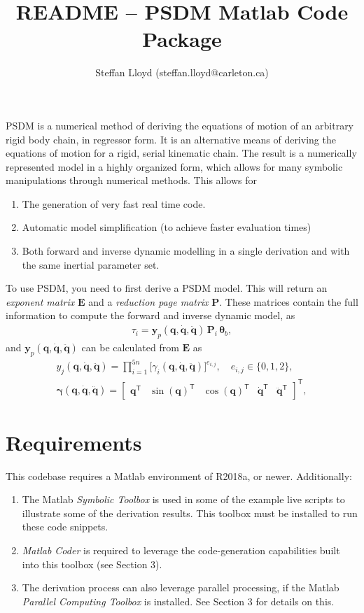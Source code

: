 \documentclass[12pt]{article}
\title{README -- PSDM Matlab Code Package}
\author{Steffan Lloyd (steffan.lloyd@carleton.ca)}
\renewcommand{\b}[1]{\mathbf{#1}}
\newcommand{\transpose}{\mathsf{T}}
\newcommand{\q}{\b{q}}
\newcommand{\qd}{\b{\dot{q}}}
\newcommand{\qdd}{\b{\ddot{q}}}
\newcommand{\bE}{\b{E}}
\newcommand{\bP}{\b{P}}
\renewcommand{\bP}{\b{P}}
\begin{document}
\maketitle

PSDM is a numerical method of deriving the equations of motion of an arbitrary rigid body chain, in regressor form. It is an alternative means of deriving the equations of motion for a rigid, serial kinematic chain. The result is a numerically represented model in a highly organized form, which allows for many symbolic manipulations through numerical methods. This allows for

\begin{enumerate}[itemsep=0pt]
 \item The generation of very fast real time code.
 \item Automatic model simplification (to achieve faster evaluation times)
 \item Both forward and inverse dynamic modelling in a single derivation and with the same inertial parameter set.
\end{enumerate}

To use PSDM, you need to first derive a PSDM model. This will return an \textit{exponent matrix} $\mathbf{E}$ and a \textit{reduction page matrix} $\mathbf{P}$. These matrices contain the full information to compute the forward and inverse dynamic model, as
\begin{align}\label{eq:ID}
	\tau_i = \mathbf{y}_p(\q, \qd, \qdd) \, \bP_i \, \mathbf{\theta}_b,
\end{align}
and $\b{y}_p(\q, \qd, \qdd)$ can be calculated from $\bE$ as
\begin{align}
		y_j(\q, \qd, \qdd) = \prod_{i=1}^{5n} \Big[\gamma_i(\q, \qd, \qdd)\Big]^{e_{i,j}}, \quad e_{i,j} \in \big\{0, 1, 2\big\},\\
		\b{\gamma}(\q, \qd, \qdd) = \begin{bmatrix}\q^\transpose & \sin(\q)^\transpose & \cos(\q)^\transpose & \qd^\transpose & \qdd ^\transpose \end{bmatrix}^\transpose,
\end{align}

\section{Requirements}
This codebase requires a Matlab environment of R2018a, or newer. Additionally:
\begin{enumerate}
\item The Matlab \textit{Symbolic Toolbox} is used in some of the example live scripts to illustrate some of the derivation results. This toolbox must be installed to run these code snippets.
\item \textit{Matlab Coder} is required to leverage the code-generation capabilities built into this toolbox (see Section 3).
\item The derivation process can also leverage parallel processing, if the Matlab \textit{Parallel Computing Toolbox} is installed. See Section 3 for details on this. 
\end{enumerate}
\end{document}

